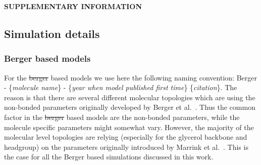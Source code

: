 \documentclass[pre,aps,floatfix,authordate1-4,twocolumn]{revtex4-1}
\providecommand{\DIFadd}[1]{{\protect\color{blue}\uwave{#1}}} %
\providecommand{\DIFdel}[1]{{\protect\color{red}\sout{#1}}}                      %
\providecommand{\DIFaddbegin}{} %
\providecommand{\DIFaddend}{} %
\providecommand{\DIFdelbegin}{} %
\providecommand{\DIFdelend}{} %
\begin{document}
\appendix
\begin{center}
{\bf SUPPLEMENTARY INFORMATION}
\end{center}
\subsection{Simulation details} 
\subsubsection{Berger based models}
For the \DIFdelbegin \DIFdel{berger }\DIFdelend \DIFaddbegin \DIFadd{Berger }\DIFaddend based models we use here the following naming convention: 
Berger - \{{\it molecule name}\} - \{{\it year when model published first time}\} \{{\it citation}\}.
The reason is that there are several different molecular topologies which are using the non-bonded parameters originally
developed by Berger et al.~\cite{berger97}. Thus the common factor in the \DIFdelbegin \DIFdel{berger }\DIFdelend \DIFaddbegin \DIFadd{Berger }\DIFaddend based models are the non-bonded parameters,
while the molecule specific parameters might somewhat vary. However, the majority of the molecular level topologies are 
relying (especially for the glycerol backbone and headgroup) on the parameters originally introduced by Marrink et al.~\cite{marrink98}.
This is the case for all the Berger based simulations discussed in this work.
\end{document}
